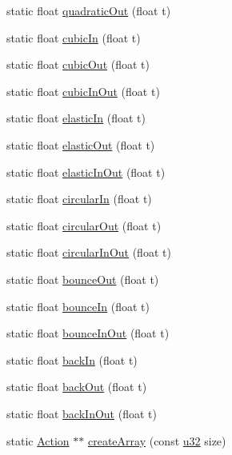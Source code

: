 \begin{DoxyCompactItemize}
\item 
static float \mbox{\hyperlink{classnjli_1_1_action_aef13ae615852df07b02a200554c517be}{quadratic\+Out}} (float t)
\item 
static float \mbox{\hyperlink{classnjli_1_1_action_a95dc3002cea9c237eda7e6c38866f7f9}{cubic\+In}} (float t)
\item 
static float \mbox{\hyperlink{classnjli_1_1_action_aa324a492852f73c940e54bc991b91826}{cubic\+Out}} (float t)
\item 
static float \mbox{\hyperlink{classnjli_1_1_action_a2c4c1e6e2a225d5104ec6736f3036a45}{cubic\+In\+Out}} (float t)
\item 
static float \mbox{\hyperlink{classnjli_1_1_action_af89d90b8b772764145b8efb367958c69}{elastic\+In}} (float t)
\item 
static float \mbox{\hyperlink{classnjli_1_1_action_a6b42a2698d6b55614eeece5870af0f08}{elastic\+Out}} (float t)
\item 
static float \mbox{\hyperlink{classnjli_1_1_action_a8fc6173595ee8efb7849bf28e635cbfd}{elastic\+In\+Out}} (float t)
\item 
static float \mbox{\hyperlink{classnjli_1_1_action_a56c6f671a7f57115207c14152f100460}{circular\+In}} (float t)
\item 
static float \mbox{\hyperlink{classnjli_1_1_action_a742f42953df58693dd7dbf4c104e1d89}{circular\+Out}} (float t)
\item 
static float \mbox{\hyperlink{classnjli_1_1_action_a008a0a7853db18242a35c744c39400b6}{circular\+In\+Out}} (float t)
\item 
static float \mbox{\hyperlink{classnjli_1_1_action_a11fcfa042ebf4eb68c8fa59b3e1ee08a}{bounce\+Out}} (float t)
\item 
static float \mbox{\hyperlink{classnjli_1_1_action_ac5fc969457877f55eb7db183cbcde90c}{bounce\+In}} (float t)
\item 
static float \mbox{\hyperlink{classnjli_1_1_action_a7b22ee890ce89aeb747dc1891233228a}{bounce\+In\+Out}} (float t)
\item 
static float \mbox{\hyperlink{classnjli_1_1_action_a134b999b4e1fd9c95a70ffc8b1436a61}{back\+In}} (float t)
\item 
static float \mbox{\hyperlink{classnjli_1_1_action_a0aa07d335453dd7b7ee828b1166c7a20}{back\+Out}} (float t)
\item 
static float \mbox{\hyperlink{classnjli_1_1_action_a201655b8f132351399eec03dead46a05}{back\+In\+Out}} (float t)
\item 
static \mbox{\hyperlink{classnjli_1_1_action}{Action}} $\ast$$\ast$ \mbox{\hyperlink{classnjli_1_1_action_a8f74322c9c8a1c256a423886feee255e}{create\+Array}} (const \mbox{\hyperlink{_util_8h_a10e94b422ef0c20dcdec20d31a1f5049}{u32}} size)
$$
\end{DoxyCompactItemize}

